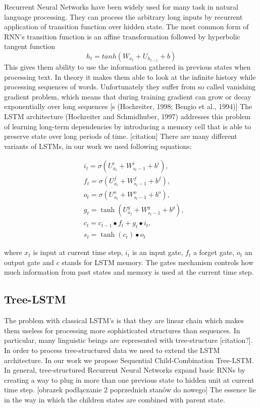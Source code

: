 \documentclass[10pt, a4paper]{article}
\begin{document}
Recurrent Neural Networks have been widely used for many task in natural language processing. They can process the arbitrary long inputs by recurrent application of transition function over hidden state. 
	The most common form of RNN's transition function is an affine transformation followed by hyperbolic tangent function
	\begin{equation} h_t = tanh(W_{x_t}+U_{h_{t-1}}+b)
\end{equation}
	  	This gives them ability to use the information gathered in previous states when processing text. In theory it makes them able to look at the infinite history while processing sequences of words. 	Unfortunately they suffer from so called vanishing gradient problem, which means that during training gradient can grow or decay exponentially over long sequences [s (Hochreiter,
1998; Bengio et al., 1994)]
	The LSTM architecture (Hochreiter and Schmidhuber, 1997) addresses this problem of learning long-term dependencies by introducing a memory cell that is able to preserve state over long periods of time. [citation]
		There are many different variants of LSTMs, in our work we used following equations:
		
\begin{equation}
\begin{split}
		&i_t = \sigma(U_{x_t}^i + W_{s_t-1}^i + b^i) ,\\
		&f_t = \sigma(U_{x_t}^f + W_{s_t-1}^f + b^f) ,\\
		&o_t = \sigma(U_{x_t}^o + W_{s_t-1}^o + b^o) ,\\
		&g_t = \tanh(U_{x_t}^g+ W_{s_t-1}^g + b^g) ,\\
		&c_t = c_{t-1} \bullet f_t + g_t \bullet i_t ,\\
		&s_t = \tanh(c_t) \bullet o_t 
\end{split}
\end{equation}

		where $x_t$ is input at current time step, $i_t$ is an input gate, $f_t$ a forget gate, $o_t$ an output gate and $c$ stands for LSTM memory.
		The gates mechanism controls how much information from past states and memory is used at the current time step. 

\subsection{Tree-LSTM}
	The problem with classical LSTM's is that they are linear chain which makes them useless for processing more sophisticated structures than sequences. In particular, many linguistic beings are represented with tree-structure [citation?].
	In order to process tree-structured data we need to extend the LSTM architecture. In our work we propose Sequential Child-Combination Tree-LSTM.
	In general, tree-structured Recurrent Neural Networks expand basic RNNs by creating a way to plug in more than one previous state to hidden unit at current time step.
	[obrazek podłączanie 2 poprzednich stanów do nowego]
	The essence lie in the way in which the children states are combined with parent state.
\end{document}
